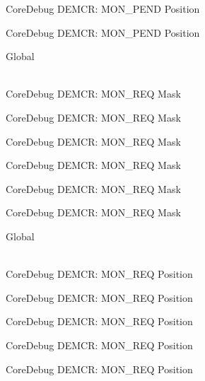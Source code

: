 \begin{DoxyRefList}
\label{deprecated__deprecated000502}%
%
Core\+Debug DEMCR\+: MON\+\_\+\+PEND Position 

\label{deprecated__deprecated000604}%
%
Core\+Debug DEMCR\+: MON\+\_\+\+PEND Position  
\item[{\parbox[t]{\linewidth}{Global \doxylink{group___c_m_s_i_s___core_debug_gae6384cbe8045051186d13ef9cdeace95}{Core\+Debug\+\_\+\+DEMCR\+\_\+\+MON\+\_\+\+REQ\+\_\+\+Msk} }}]\hfill \\
\label{deprecated__deprecated000048}%
%
Core\+Debug DEMCR\+: MON\+\_\+\+REQ Mask 

\label{deprecated__deprecated000192}%
%
Core\+Debug DEMCR\+: MON\+\_\+\+REQ Mask 

\label{deprecated__deprecated000334}%
%
Core\+Debug DEMCR\+: MON\+\_\+\+REQ Mask 

\label{deprecated__deprecated000410}%
%
Core\+Debug DEMCR\+: MON\+\_\+\+REQ Mask 

\label{deprecated__deprecated000499}%
%
Core\+Debug DEMCR\+: MON\+\_\+\+REQ Mask 

\label{deprecated__deprecated000601}%
%
Core\+Debug DEMCR\+: MON\+\_\+\+REQ Mask  
\item[{\parbox[t]{\linewidth}{Global \doxylink{group___c_m_s_i_s___core_debug_ga341020a3b7450416d72544eaf8e57a64}{Core\+Debug\+\_\+\+DEMCR\+\_\+\+MON\+\_\+\+REQ\+\_\+\+Pos} }}]\hfill \\
\label{deprecated__deprecated000047}%
%
Core\+Debug DEMCR\+: MON\+\_\+\+REQ Position 

\label{deprecated__deprecated000191}%
%
Core\+Debug DEMCR\+: MON\+\_\+\+REQ Position 

\label{deprecated__deprecated000333}%
%
Core\+Debug DEMCR\+: MON\+\_\+\+REQ Position 

\label{deprecated__deprecated000409}%
%
Core\+Debug DEMCR\+: MON\+\_\+\+REQ Position 

\label{deprecated__deprecated000498}%
%
Core\+Debug DEMCR\+: MON\+\_\+\+REQ Position 


\end{DoxyRefList}

